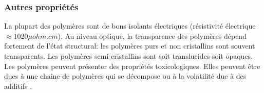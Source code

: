 \subsubsection{Autres propri\'et\'es}
\par{
La plupart des polym\`eres sont de bons isolants \'electriques (r\'esistivit\'e \'electrique $\approx 1020 \mu ohm.cm$). Au niveau optique, la transparence des polym\`eres d\'epend fortement de l'\'etat structural: les polym\`eres purs et non cristallins sont souvent transparents. Les polym\`eres semi-cristallins sont soit translucides soit opaques. Les polym\`eres peuvent pr\'esenter des propri\'et\'es toxicologiques. Elles peuvent \^etre dues \`a une cha\^ine de polym\`eres qui se d\'ecompose ou \`a la volatilit\'e due \`a des additifs  {\citep{lecomte2009physique}}.
}